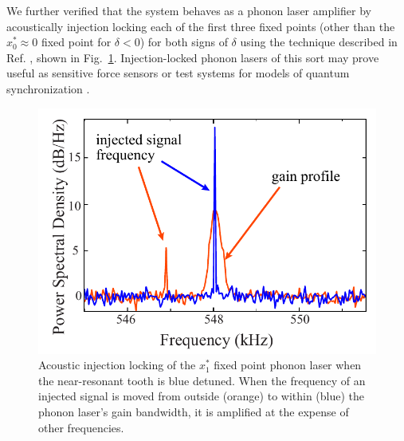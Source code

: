 \documentclass[preprint,superscriptaddress,amsmath,amssymb,aps,prl]{revtex4-1}
\begin{document}
We further verified that the system behaves as a phonon laser amplifier by acoustically injection locking each of the first three fixed points (other than the $x_0^\ast \approx 0$ fixed point for $\delta<0$) for both signs of $\delta$ using the technique described in Ref. \cite{Knunz2010injection}, shown in Fig.~\ref{fig:InjectionLock}. Injection-locked phonon lasers of this sort may prove useful as sensitive force sensors \cite{Knunz2010injection} or test systems for models of quantum synchronization \cite{Lee2013quantum,Lee2014entanglement,Hush2015spin}.

\begin{figure}
\begin{center}
\includegraphics[width=1.0\columnwidth]{injection_lock_03.pdf}
\end{center}
\caption{Acoustic injection locking of the $x^\ast_1$ fixed point phonon laser when the near-resonant tooth is blue detuned.  When the frequency of an injected signal is moved from outside (orange) to within (blue) the phonon laser's gain bandwidth, it is amplified at the expense of other frequencies.}
\label{fig:InjectionLock}
\end{figure}
\end{document}
